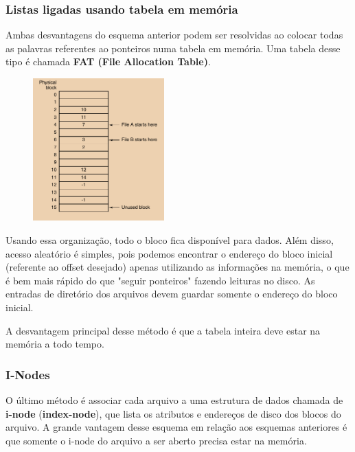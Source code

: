 \documentclass{article}
\begin{document}
\subsubsection{Listas ligadas usando tabela em memória}

Ambas desvantagens do esquema anterior podem ser resolvidas ao colocar todas as palavras referentes ao ponteiros numa tabela em memória. Uma tabela desse tipo é chamada \textbf{FAT (File Allocation Table)}.

\begin{figure}[h]
  \begin{center}
    \includegraphics[width=0.45\textwidth]{img/5-10.png}
  \end{center}
  \caption{}
  \label{fig:}
\end{figure}

Usando essa organização, todo o bloco fica disponível para dados. Além disso, acesso aleatório é simples, pois podemos encontrar o endereço do bloco inicial (referente ao offset desejado) apenas utilizando as informações na memória, o que é bem mais rápido do que "seguir ponteiros" fazendo leituras no disco. As entradas de diretório dos arquivos devem guardar somente o endereço do bloco inicial.

A desvantagem principal desse método é que a tabela inteira deve estar na memória a todo tempo.

\subsubsection{I-Nodes}

O último método é associar cada arquivo a uma estrutura de dados chamada de \textbf{i-node} (\textbf{index-node}), que lista os atributos e endereços de disco dos blocos do arquivo. A grande vantagem desse esquema em relação aos esquemas anteriores é que somente o i-node do arquivo a ser aberto precisa estar na memória.
\end{document}
